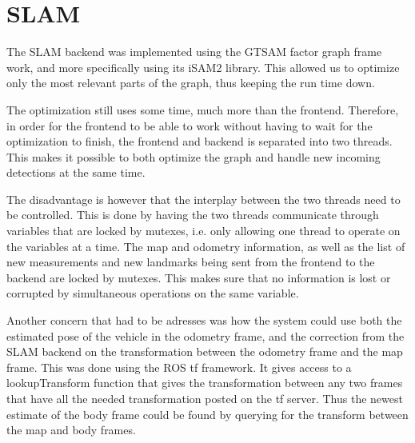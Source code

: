 \section{SLAM}

The SLAM backend was implemented using the GTSAM factor graph frame work\cite{GTSAM}, and more specifically using its iSAM2\cite{iSAM2} library. This allowed us to optimize only the most relevant parts of the graph, thus keeping the run time down. 

The optimization still uses some time, much more than the frontend. Therefore, in order for the frontend to be able to work without having to wait for the optimization to finish, the frontend and backend is separated into two threads. This makes it possible to both optimize the graph and handle new incoming detections at the same time. 

The disadvantage is however that the interplay between the two threads need to be controlled. This is done by having the two threads communicate through variables that are locked by mutexes, i.e. only allowing one thread to operate on the variables at a time. The map and odometry information, as well as the list of new measurements and new landmarks being sent from the frontend to the backend are locked by mutexes. This makes sure that no information is lost or corrupted by simultaneous operations on the same variable. 

Another concern that had to be adresses was how the system could use both the estimated pose of the vehicle in the odometry frame, and the correction from the SLAM backend on the transformation between the odometry frame and the map frame. This was done using the ROS tf framework. It gives access to a lookupTransform function that gives the transformation between any two frames that have all the needed transformation posted on the tf server. Thus the newest estimate of the body frame could be found by querying for the transform between the map and body frames. 